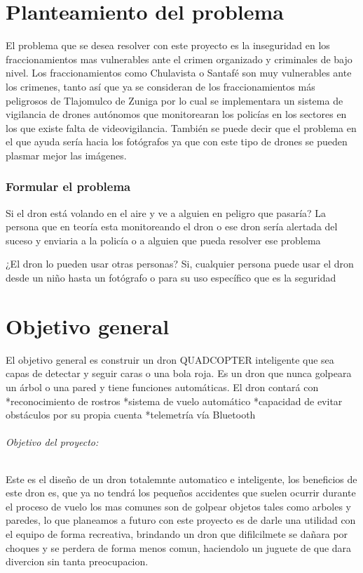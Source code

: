\documentclass[11pt,a4paper]{article}
\begin{document}
\part{Planteamiento del problema}
El problema que se desea resolver con este proyecto es la inseguridad en los fraccionamientos mas vulnerables ante el crimen organizado y criminales de bajo nivel.
Los fraccionamientos como Chulavista o Santafé son muy vulnerables ante los crimenes, tanto así que ya se consideran de los fraccionamientos más peligrosos de Tlajomulco de Zuniga por lo cual se implementara un sistema de vigilancia de drones autónomos que monitorearan los policías en los  sectores en los que existe  falta de videovigilancia.
También se puede decir que el problema en el que ayuda sería hacia los fotógrafos ya que con este tipo de drones se pueden plasmar mejor las imágenes.

\section{Formular el problema}
Si el dron está volando en el aire y ve a alguien en peligro que pasaría?
La persona que en teoría esta monitoreando el dron o ese dron sería alertada del suceso y enviaria a la policía o a alguien que pueda resolver ese problema

¿El dron lo pueden usar otras personas?
Si, cualquier persona puede usar el dron desde un niño hasta un fotógrafo o para su uso específico que es la seguridad

\part{Objetivo general}
El objetivo general es construir un dron QUADCOPTER inteligente
que sea capas de detectar y seguir caras o
una bola roja.
Es un dron que nunca golpeara un árbol o
una pared y tiene funciones automáticas.
El dron contará con
*reconocimiento de rostros
*sistema de vuelo automático
*capacidad de evitar obstáculos por su
propia cuenta
*telemetría vía Bluetooth

\paragraph{Objetivo del proyecto:}


Este es el diseño de un dron totalemnte automatico e inteligente, los beneficios de este dron es, que ya no tendrá los pequeños accidentes que suelen ocurrir durante el proceso de vuelo los mas comunes son de golpear objetos tales como arboles y paredes, lo que planeamos a futuro con este proyecto es de darle una utilidad con el equipo de forma recreativa, brindando un dron que difilcilmete se dañara por choques y se perdera de forma menos comun, haciendolo un juguete de que dara divercion sin tanta preocupacion.
\end{document}
